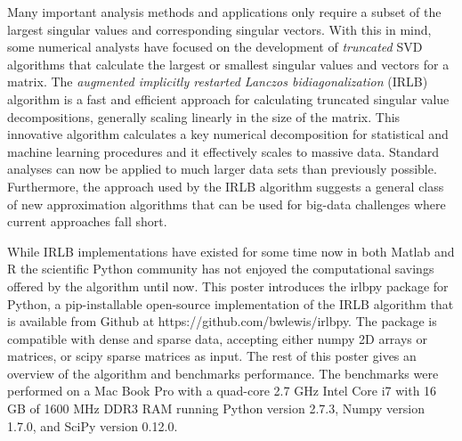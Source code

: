 \documentclass[landscape,a0b,final]{a0poster}
\newenvironment{poster}{
  \begin{center}
  \begin{minipage}[c]{0.98\textwidth}
}{
  \end{minipage} 
  \end{center}
}
\newcommand{\pbox}[4]{
\psshadowbox[#3]{
\begin{minipage}[t][#2][t]{#1}
#4
\end{minipage}
}}
\begin{document}
\begin{poster}
\begin{multicols}{3}
\vspace{0.75cm}

Many important analysis methods and applications only require a subset of the
largest singular values and corresponding singular vectors. With this in mind,
some numerical analysts have focused on the development of {\em truncated} SVD
algorithms that calculate the largest or smallest singular values and vectors
for a matrix.  The {\em augmented implicitly restarted Lanczos
bidiagonalization} (IRLB) algorithm \cite{Baglama2006} is a fast and efficient
approach for calculating truncated singular value decompositions, generally
scaling linearly in the size of the matrix. This innovative algorithm
calculates a key numerical decomposition for statistical and machine learning
procedures and it effectively scales to massive data.  Standard analyses can
now be applied to much larger data sets than previously possible.  Furthermore,
the approach used by the IRLB algorithm suggests a general class of new
approximation algorithms that can be used for big-data challenges where current
approaches fall short.

\vspace{0.75cm}

While IRLB implementations have existed for some time now in both Matlab
\cite{irlbaMatlab} and R \cite{irlbaR} the scientific Python community has not
enjoyed the computational savings offered by the algorithm until now.  This
poster introduces the irlbpy package for Python, a pip-installable open-source
implementation of the IRLB algorithm that is available from Github at
https://github.com/bwlewis/irlbpy. The package is compatible with dense and
sparse data, accepting either numpy 2D arrays or matrices, or scipy sparse
matrices as input. The rest of this poster gives an overview of the algorithm
and benchmarks performance.  The benchmarks were performed on a Mac Book Pro
with a quad-core 2.7 GHz Intel Core i7 with 16 GB of 1600 MHz DDR3 RAM running
Python version 2.7.3, Numpy version 1.7.0, and SciPy version 0.12.0.


\vspace{2cm}\begin{center}\pbox{0.8\columnwidth}{}{linewidth=2mm,framearc=0.1,fillstyle=gradient,gradangle=0,gradbegin=white,gradend=white,gradmidpoint=1.0,framesep=1em}{\begin{center}\bf{Partial SVD Definition}\end{center}}\end{center}\vspace{1.25cm}


\end{multicols}
\end{poster}
\end{document}

